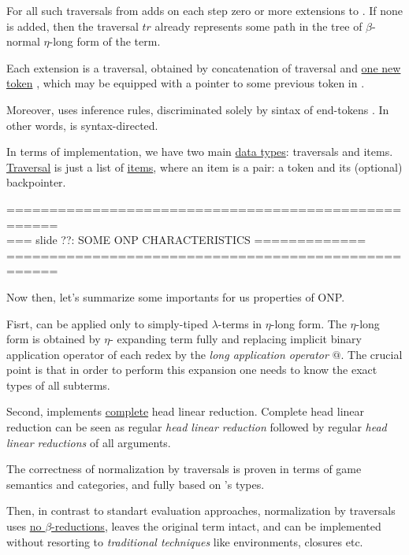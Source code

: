 \documentclass[a4paper, 10pt]{article} %
\newcommand{\red}[1]{{\color{red}#1}}
\newcommand{\green}[1]{{\color{blue!20!black!30!green}#1}}
\newcommand{\blue}[1]{{\color{blue}#1}}
\newcommand{\lam}[1]{{\color{brown}\emph{\boldmath{#1}}}}
\begin{document}
For all such traversals from \lam{$\mathfrak{Trav}(M)$} \lam{ONP} adds on
each step zero or more extensions to \lam{$\mathfrak{Trav}(M)$}. 
If none is added, then the traversal $tr$ already represents some path in
the tree of $\beta$-normal $\eta$-long form of the term.

Each extension is a traversal, obtained by concatenation of traversal
\lam{$tr$} and \underline{one new token} \lam{$t'$}, which may be
equipped with a pointer to some previous token in \lam{$tr$}.

Moreover, \lam{ONP} uses inference rules, discriminated solely by sintax
of end-tokens \lam{$t_n$}. In other words, \lam{ONP} is \blue{syntax-directed}.

In terms of implementation, we have two main \underline{data types}:
traversals and items. \underline{Traversal} is just a list of
\underline{items}, where an item is a pair: a token and its (optional) 
backpointer.

====================================================\\
=== slide ??: SOME ONP CHARACTERISTICS =============\\
====================================================

Now then, let's summarize some importants for us properties of \green{ONP}.

Fisrt, \lam{ONP} can be applied only to \blue{simply-tiped} $\lambda$-terms
in \blue{$\eta$-long form}. The $\eta$-long form is obtained by $\eta$-
expanding term fully and replacing implicit binary application operator of
each redex by the \emph{long application operator} $@$. The crucial
point is that in order to perform this expansion one needs to know the exact 
types of all subterms.

Second, \lam{ONP} implements \green{\underline{complete} head linear
reduction}. Complete head linear reduction can be seen as regular
\emph{head linear reduction} followed by regular \emph{head linear 
reductions} of all arguments.

The correctness of normalization by traversals is proven in terms of game 
semantics and categories, and fully based on \lam{$M$}'s types.

Then, in contrast to standart evaluation approaches, normalization by 
traversals uses \red{\underline{no $\beta$-reductions}}, leaves the original 
term intact, and can be implemented without resorting to \emph{traditional 
techniques} like environments, closures etc.
\end{document}
